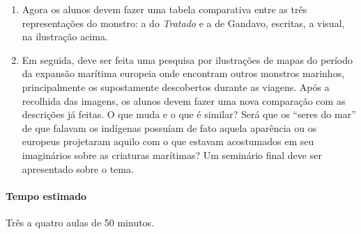 \documentclass[12pt]{extarticle}
\begin{document}
{\begin{enumerate}
\begin{quote}
para que melhor se pudesse ajudar da vista, foi sentido do mesmo
monstro, o qual em levantando a cabeça, tanto que o viu, começou de
caminhar para o mar donde viera. Nisto conheceu o mancebo que
era aquilo coisa do mar, e antes que nele se metesse, acudiu com muita
presteza a tomar"--lhe a dianteira, e vendo o monstro que ele lhe embargava 
o caminho, levantou"--se direito para cima como um homem, fincado sobre as 
barbatanas do rabo, e estando assim a par com ele, deu"-lhe uma estocada 
pela barriga, e dando"--lha no mesmo instante se desviou para uma parte 
com tanta velocidade, que não pôde o monstro levá"-lo debaixo de si; 
porém não pouco afrontado, porque o grande torno
de sangue que saiu da ferida, lhe deu no rosto com tanta força que
quase ficou sem nenhuma vista.
\end{quote}


\item Agora os alunos devem fazer uma tabela comparativa entre as três 
representações do monstro: a do \emph{Tratado} e a de Gandavo, escritas,
a visual, na ilustração acima. 

\item 
Em seguida, deve ser feita uma pesquisa por ilustrações de mapas do
período da expansão marítima europeia onde encontram outros monstros
marinhos, principalmente os supostamente descobertos durante as viagens.
Após a recolhida das imagens, os alunos devem fazer uma nova comparação 
com as descrições já feitas. O que muda e o que é similar? 
Será que os ``seres do mar'' de que falavam os indígenas possuíam de fato
aquela aparência ou os europeus projetaram aquilo com o que estavam 
acostumados em seu imaginários sobre as criaturas marítimas? 
Um seminário final deve ser apresentado sobre o tema. 

\end{enumerate}

\paragraph{Tempo estimado} Três a quatro aulas de 50 minutos.


}
\end{document}
